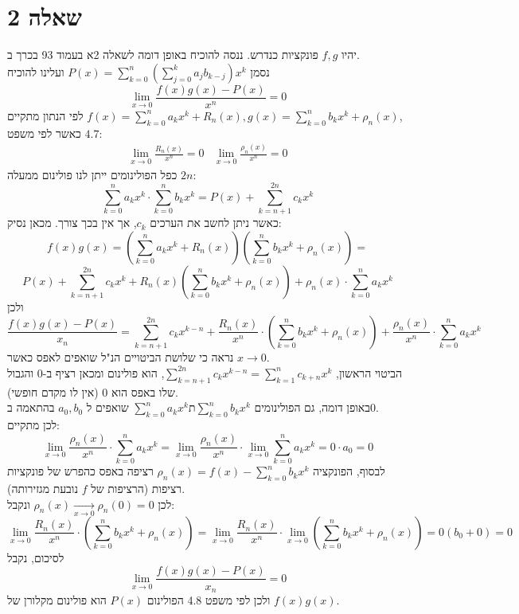 \documentclass{article}
\begin{document}
\pagebreak

\section*{שאלה 2}

יהיו $f,g$ פונקציות כנדרש. ננסה להוכיח באופן דומה לשאלה 2א בעמוד 93 בכרך ב. \\
נסמן $P(x)=\sum_{k=0}^{n}(\sum_{j=0}^ka_jb_{k-j})x^k$
ועלינו להוכיח
\[
    \lim_{x\rightarrow 0} \frac{f(x)g(x)-P(x)}{x^n}=0
\]
לפי הנתון מתקיים $f(x)=\sum_{k=0}^na_kx^k + R_n(x), g(x)=\sum_{k=0}^nb_kx^k+\rho_n(x)$, \\
כאשר לפי משפט $4.7$:
\[
    \begin{matrix}
        \lim_{x\rightarrow 0}\frac{R_n(x)}{x^n} = 0 &
        \lim_{x\rightarrow 0}\frac{\rho_n(x)}{x^n} = 0
    \end{matrix}
\]
כפל הפולינומים ייתן לנו פולינום ממעלה $2n$:
\[
    \sum_{k=0}^na_kx^k \cdot \sum_{k=0}^nb_kx^k =
    P(x) + \sum_{k=n+1}^{2n} c_kx^k
\]
כאשר ניתן לחשב את הערכים $c_k$, אך אין בכך צורך. מכאן נסיק:
\[
    f(x)g(x) = (\sum_{k=0}^na_kx^k + R_n(x))(\sum_{k=0}^nb_kx^k+\rho_n(x)) =
\]
\[
    P(x) + \sum_{k=n+1}^{2n} c_kx^k + R_n(x)(\sum_{k=0}^nb_kx^k+\rho_n(x)) + \rho_n(x) \cdot \sum_{k=0}^na_kx^k
\]
ולכן
\[
    \frac{f(x)g(x)-P(x)}{x_n} =
    \sum_{k=n+1}^{2n} c_kx^{k-n} + \frac{R_n(x)}{x^n}\cdot(\sum_{k=0}^nb_kx^k+\rho_n(x)) + \frac{\rho_n(x)}{x^n}\cdot \sum_{k=0}^na_kx^k
\]
נראה כי שלושת הביטויים הנ"ל שואפים לאפס כאשר $x\rightarrow 0$. \\
הביטוי הראשון, $\sum_{k=n+1}^{2n} c_kx^{k-n}=\sum_{k=1}^{n} c_{k+n}x^k$,
הוא פולינום ומכאן רציף ב-0 והגבול שלו באפס הוא $0$ (אין לו מקדם חופשי). \\
באופן דומה, גם הפולינומים $\sum_{k=0}^na_kx^kת \sum_{k=0}^nb_kx^k$ שואפים ל $a_0, b_0$ בהתאמה ב$0$. \\
לכן מתקיים:
\[
    \lim_{x\rightarrow 0} \frac{\rho_n(x)}{x^n}\cdot \sum_{k=0}^na_kx^k =
    \lim_{x\rightarrow 0} \frac{\rho_n(x)}{x^n}\cdot \lim_{x\rightarrow 0}\sum_{k=0}^na_kx^k =
    0 \cdot a_0 = 0
\]
לבסוף, הפונקציה $\rho_n(x)=f(x)-\sum_{k=0}^nb_kx^k$
רציפה באפס כהפרש של פונקציות רציפות (הרציפות של $f$ נובעת מגזירותה). \\
לכן $\rho_n(x)\xrightarrow[x\rightarrow 0]{}\rho_n(0)=0$ ונקבל:
\[
    \lim_{x\rightarrow 0} \frac{R_n(x)}{x^n}\cdot(\sum_{k=0}^nb_kx^k+\rho_n(x)) =
    \lim_{x\rightarrow 0} \frac{R_n(x)}{x^n}\cdot \lim_{x\rightarrow 0}(\sum_{k=0}^nb_kx^k+\rho_n(x)) =
    0 (b_0+0)=0
\]
לסיכום, נקבל
\[
    \lim_{x\rightarrow 0}\frac{f(x)g(x)-P(x)}{x_n}=0
\]
ולכן לפי משפט 4.8 הפולינום $P(x)$
הוא פולינום מקלורן של $f(x)g(x)$.
\end{document}
